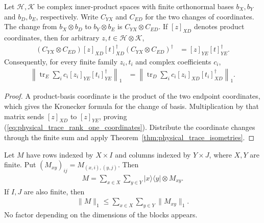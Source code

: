 \begin{theorem}
    \label{thm:physical_trace_basis_independence}
    \leanok
    Let $\mathcal H,\mathcal K$ be complex inner-product spaces with finite
    orthonormal bases $b_X,b_Y$ and $b_D,b_E$, respectively.
    Write $C_{YX}$ and $C_{ED}$ for the two changes of coordinates.
    The change from $b_X\otimes b_D$ to $b_Y\otimes b_E$ is
    $C_{YX}\otimes C_{ED}$. If $[z]_{XD}$ denotes product coordinates,
    then for arbitrary $z,t\in\mathcal H\otimes\mathcal K$,
    \begin{align}
        (C_{YX}\otimes C_{ED})[z]_{XD}[t]_{XD}^{\dagger}
        (C_{YX}\otimes C_{ED})^{\dagger}
         & =[z]_{YE}[t]_{YE}^{\dagger}.
        \label{eq:physical_trace_rank_one_coordinates}
    \end{align}
    Consequently, for every finite family $z_i,t_i$ and complex coefficients
    $c_i$,
    \begin{align}
        \left\|\operatorname{tr}_{E}
        \sum_i c_i[z_i]_{YE}[t_i]_{YE}^{\dagger}\right\|_1
         & =\left\|\operatorname{tr}_{D}
        \sum_i c_i[z_i]_{XD}[t_i]_{XD}^{\dagger}\right\|_1.
    \end{align}
\end{theorem}

\begin{proof}\leanok
    A product-basis coordinate is the product of the two endpoint coordinates,
    which gives the Kronecker formula for the change of basis. Multiplication
    by that matrix sends $[z]_{XD}$ to $[z]_{YE}$, proving
    (\ref{eq:physical_trace_rank_one_coordinates}). Distribute the coordinate
    changes through the finite sum and apply
    Theorem~\ref{thm:physical_trace_isometries}.
\end{proof}

\begin{theorem}
    \label{thm:physical_trace_block_reconstruction}
    \leanok
    Let $M$ have rows indexed by $X\times I$ and columns indexed by
    $Y\times J$, where $X,Y$ are finite. Put
    $(M_{xy})_{ij}=M_{(x,i),(y,j)}$. Then
    \begin{align}
        M=\sum_{x\in X}\sum_{y\in Y}|x\rangle\langle y|\otimes M_{xy}.
        \label{eq:physical_trace_block_reconstruction}
    \end{align}
    If $I,J$ are also finite, then
    \begin{align}
        \|M\|_1\leq\sum_{x\in X}\sum_{y\in Y}\|M_{xy}\|_1.
        \label{eq:physical_trace_block_bound}
    \end{align}
    No factor depending on the dimensions of the blocks appears.
\end{theorem}

